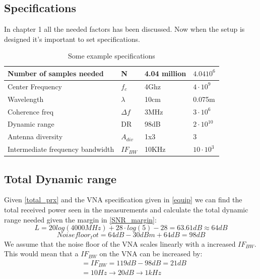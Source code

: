\subsection{Specifications}
In chapter 1 all the needed factors has been discussed. Now when the setup is designed it's important to set specifications.
\begin{table}[h]
\centering
\caption{Some example specifications}
\label{final_specs}
\begin{tabular}{|l|l|l|l|}
\hline
Number of samples needed         & N           & 4.04 million   & $4.04 10^6$        \\ \hline
Center Frequency                 & $f_c$       & 4Ghz           & $4 \cdot 10^9$     \\ \hline
Wavelength                       & $\lambda$   & 10cm           & 0.075m               \\ \hline
Coherence freq                   & $\Delta f$  & 3MHz           & $3 \cdot 10^6$     \\ \hline
Dynamic range                    & DR          & 98dB           & $2\cdot 10^10$             \\ \hline
Antenna diversity                & $A_{div}$   & 1x3            & 3                  \\ \hline
Intermediate frequency bandwidth & $IF_{BW}$     & 10KHz          & $10 \cdot 10^3$ \\ \hline
\end{tabular}
\end{table}
\subsection{Total Dynamic range}
Given \autoref{total_prx} and the VNA specification given in \autoref{equip} we can find the total received power seen in the measurements and calculate the total dynamic range needed given the margin in \autoref{SNR_margin}:
\begin{equation}
L = 20log (4000MHz) + 28 \cdot log(5)-28 = 63.61dB \approx 64dB
\end{equation}
\begin{equation}
Noisefloor_tot = 64dB - 30dBm + 64dB = 98dB 
\end{equation}
We assume that the noise floor of the \gls{VNA} scales linearly with a increased $IF_{BW}$. This would mean that a $IF_{BW}$ on the \gls{VNA} can be increased by:
\begin{equation}
\begin{split}
&= IF_{BW} = 119dB-98dB = 21dB \\
           &= 10Hz \rightarrow 20dB \rightarrow 1kHz
\end{split}
\end{equation}
